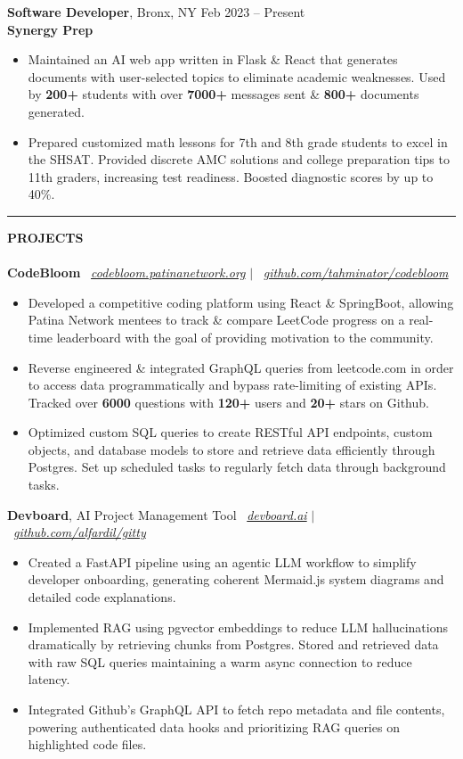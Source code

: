 \documentclass[11pt]{article}
\newcommand{\resumeSection}[1]{%
  \rule{0.04\textwidth}{0.4pt}%
  \textbf{\Large \uppercase{#1}}%
  \hrulefill\\[0.2em]
}
\newenvironment{resumeItemize}{%
  \setlist{nolistsep}
  \begin{itemize}[leftmargin=*, label=\textbullet, itemsep=0.3em]
}{%
  \end{itemize}
}
\newcommand{\resumeSubItem}[1]{\item \small #1}
\newcommand{\githubLink}[2]{{\small \faGithub\ \textit{\href{#1}{#2}}}}
\newcommand{\duplicate}[2]{{\small \faGlobe\ \textit{\href{#1}{#2}}}}
\begin{document}
\medskip



\textbf{\large Software Developer}, Bronx, NY \hfill {\small Feb 2023 -- Present} \\ [0.25em]
\textbf{Synergy Prep}
\begin{resumeItemize}
  \resumeSubItem{Maintained an AI web app written in Flask \& React that generates documents with user-selected
    topics to eliminate academic weaknesses. Used by \textbf{200+} students with over \textbf{7000+} messages sent \& \textbf{800+} documents generated.}
  \resumeSubItem{Prepared customized math lessons for 7th and 8th grade students to excel in the SHSAT. Provided
    discrete AMC solutions and college preparation tips to 11th graders, increasing test readiness. Boosted diagnostic scores by up to 40\%.}
\end{resumeItemize}

\bigskip

\resumeSection{Projects}
\\[-0.5em]
\textbf{\large CodeBloom} \hfill \duplicate{https://codebloom.patinanetwork.org}{codebloom.patinanetwork.org} $|$ \githubLink{https://github.com/tahminator/codebloom}{github.com/tahminator/codebloom}
\begin{resumeItemize}
  \resumeSubItem{Developed a competitive coding platform using React \& SpringBoot, allowing Patina Network mentees to track \& compare LeetCode progress on a real-time leaderboard with the goal of providing motivation to the community.}
  \resumeSubItem{Reverse engineered \& integrated GraphQL queries from leetcode.com in order to access data programmatically and bypass rate-limiting of existing APIs. Tracked over \textbf{6000} questions with \textbf{120+} users and \textbf{20+} stars on Github.}
  \resumeSubItem{Optimized custom SQL queries to create RESTful API endpoints, custom objects, and database models to store and retrieve data efficiently through Postgres. Set up scheduled tasks to regularly fetch data through background tasks.}
\end{resumeItemize}

\medskip

\textbf{\large Devboard}\footnotesize{, AI Project Management Tool} \hfill \duplicate{https://devboard.ai}{devboard.ai} $|$ \githubLink{https://github.com/alfardil/gitty}{github.com/alfardil/gitty}
\begin{resumeItemize}
  \resumeSubItem{Created a FastAPI pipeline using an agentic LLM workflow to simplify developer onboarding,
    generating coherent Mermaid.js system diagrams and detailed code explanations.}
  \resumeSubItem{Implemented RAG using pgvector embeddings to reduce LLM hallucinations dramatically by retrieving chunks from Postgres. Stored and retrieved data with raw SQL queries maintaining a warm async connection to reduce latency.}
  \resumeSubItem{Integrated Github’s GraphQL API to fetch repo metadata and file contents, powering authenticated data hooks and prioritizing RAG queries on highlighted code files.}
\end{resumeItemize}
\end{document}
